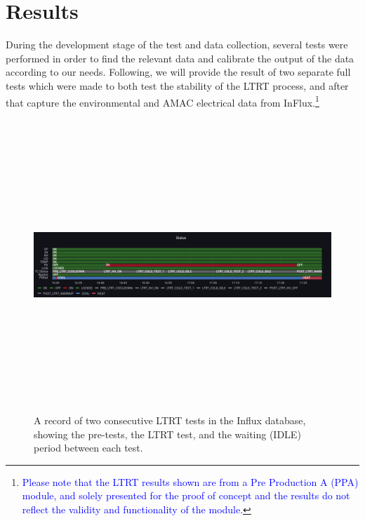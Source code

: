 
\chapter{Results} %

\label{Results} %


\newcommand{\keyword}[1]{\textbf{#1}}
\newcommand{\tabhead}[1]{\textbf{#1}}
\newcommand{\code}[1]{\texttt{#1}}
\newcommand{\file}[1]{\texttt{\bfseries#1}}
\newcommand{\option}[1]{\texttt{\itshape#1}}


During the development stage of the test and data collection, several tests were performed in order to find the relevant data and calibrate the output of the data according to our needs. Following, we will provide the result of two separate full tests which were made to both test the stability of the LTRT process, and after that capture the environmental and AMAC electrical data from InFlux.\footnote{\textcolor{blue}{Please note that the LTRT results shown are from a Pre Production A (PPA) module, and solely presented for the proof of concept and the results do not reflect the validity and functionality of the module.}} \\

 

\begin{figure}[h]
    \centering
    \includegraphics[width=14cm,height=11cm,keepaspectratio]{Figures/results/test_period.png}
    \caption{A record of two consecutive LTRT tests in the Influx database, showing the pre-tests, the LTRT test, and the waiting (IDLE) period between each test.}
    \label{fig:LTRTinflux}
\end{figure}

